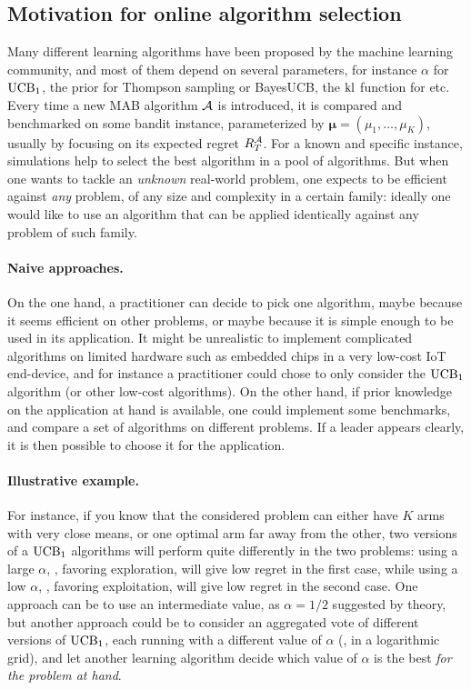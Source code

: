\subsection{Motivation for online algorithm selection}\label{sub:25:introduction}

Many different learning algorithms have been proposed by the machine learning community,
and most of them depend on several parameters, for instance $\alpha$ for $\mathrm{UCB}_1$, the prior for Thompson sampling or BayesUCB,
the $\mathrm{kl}$ function for \klUCB{} etc.
Every time a new MAB algorithm $\mathcal{A}$ is introduced, it is compared and benchmarked on some bandit instance, parameterized by $\boldsymbol{\mu} = (\mu_1,\dots,\mu_K)$, usually by focusing on its expected regret $R_T^{\mathcal{A}}$.
%
For a known and specific instance, simulations help to select the best algorithm in a pool of algorithms.
But when one wants to tackle an \emph{unknown} real-world problem, one expects to be efficient against \emph{any} problem, of any size and complexity in a certain family:
ideally one would like to use an algorithm that can be applied identically against any problem of such family.


\paragraph{Naive approaches.}
%
On the one hand, a practitioner can decide to pick one algorithm, maybe because it seems efficient on other problems, or maybe because it is simple enough to be used in its application. It might be unrealistic to implement complicated algorithms on limited hardware such as embedded chips in a very low-cost IoT end-device, and for instance a practitioner could chose to only consider the $\mathrm{UCB}_1$ algorithm (or other low-cost algorithms).
%
On the other hand, if prior knowledge on the application at hand is available, one could implement some benchmarks, and compare a set of algorithms on different problems. If a leader appears clearly, it is then possible to choose it for the application.


\paragraph{Illustrative example.}
%
For instance, if you know that the considered problem can either have $K$ arms with very close means, or one optimal arm far away from the other, two versions of a $\mathrm{UCB}_1$ algorithms will perform quite differently in the two problems:
using a large $\alpha$, \ie, favoring exploration, will give low regret in the first case,
while using a low $\alpha$, \ie, favoring exploitation, will give low regret in the second case.
One approach can be to use an intermediate value, as $\alpha=1/2$ suggested by theory, but another approach could be to consider an aggregated vote of different versions of $\mathrm{UCB}_1$, each running with a different value of $\alpha$ (\eg, in a logarithmic grid), and let another learning algorithm decide which value of $\alpha$ is the best \emph{for the problem at hand}.


